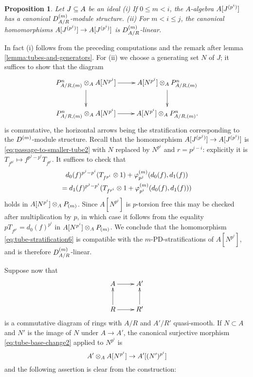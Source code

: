 \documentclass{article}
\theoremstyle{change}
\newtheorem{prop}[subsubsection]{Proposition}
\numberwithin{equation}{subsubsection}
\newcommand{\demobox}{\vrule height6pt width6pt depth0pt}
\newenvironment{demo}{\noindent{\it Proof.}}
{{\unskip\nobreak\hfil\qquad
\demobox\parfillskip=0pt\par}
\medskip}
\begin{document}
\begin{prop}\label{prop:Dm-module-str-on-tubes}
  Let $J\subseteq A$ be an ideal (i) If $0\le m<i$, the $A$-algebra
  $A[{J}^{({p^i})}]$ has a canonical ${D}^{({m})}_{A/R}$-module
  structure. (ii) For $m<i\le j$, the canonical homomorphisms
  $A[{J}^{({p^j})}]\to A[{J}^{({p^i})}]$ is ${D}^{({m})}_{A/R}$-linear.
\end{prop}
\begin{demo}
  In fact (i) follows from the preceding computations and the remark
  after lemma \ref{lemma:tubes-and-generators}. For (ii) we choose a
  generating set $N$ of $J$; it suffices to show that the diagram
  \begin{displaymath}
    \xymatrix{
      P^n_{A/R,(m)}\tens_AA[N^{p^j}]\ar[r]\ar[d]
      &A[N^{p^j}]\tens_AP^n_{A/R,(m)}\ar[d]\\
      P^n_{A/R,(m)}\tens_AA[N^{p^i}]\ar[r]
      &A[N^{p^i}]\tens_AP^n_{A/R,(m)}.
    }
  \end{displaymath}
  is commutative, the horizontal arrows being the stratification
  corresponding to the ${D}^{({m})}$-module structure. Recall that the
  homomorphism $A[{J}^{({p^j})}]\to A[{J}^{({p^i})}]$ is
  \ref{eq:passage-to-smaller-tube2} with $N$ replaced by $N^{p^i}$ and
  $r=p^{j-i}$: explicitly it is
  $T_{f^{p^j}}\mapsto f^{p^j-p^i}T_{f^{p^i}}$. It suffices to check that
  \begin{multline*}
    d_0(f)^{p^j-p^i}(T_{f^{p^i}}\otimes1)
    +{\varphi}^{({m})}_{p^j}(d_0(f),d_1(f))\\
    =d_1(f)^{p^j-p^i}(T_{f^{p^i}}\otimes1
    +{\varphi}^{({m})}_{p^i}(d_0(f),d_1(f)))
  \end{multline*}
  holds in $A[N^{p^i}]\otimes_AP_{(m)}$. Since $A[N^{p^i}]$ is
  $p$-torsion free this may be checked after multiplication by $p$, in
  which case it follows from the equality $pT_{f^{p^i}}=d_0(f)^{p^i}$ in
  $A[N^{p^i}]\otimes_AP_{(m)}$. We conclude that the homomorphism
  \ref{eq:tube-stratification6} is compatible with the
  $m$-PD-stratifications of $A[N^{p^i}]$, and is therefore
  ${D}^{({m})}_{A/R}$-linear.
\end{demo}

Suppose now that
\begin{displaymath}
  \xymatrix{
    A\ar[r]&A'\\
    R\ar[r]\ar[u]&R'\ar[u]
  }
\end{displaymath}
is a commutative diagram of rings with $A/R$ and $A'/R'$
quasi-smooth. If $N\subset A$ and $N'$ is the image of $N$ under
$A\to A'$, the canonical surjective morphism
\ref{eq:tube-base-change2} applied to $N^{p^i}$ is
\begin{equation}
  \label{eq:tube-base-change3}
  A'\otimes_AA[N^{p^i}]\to A'[(N')^{p^i}]
\end{equation}
and the following assertion is clear from the construction:
\end{document}
